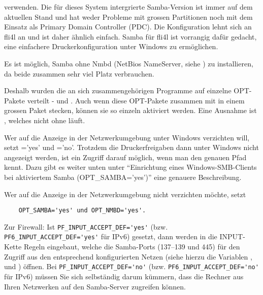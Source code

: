 
    verwenden. Die für dieses System intergrierte Samba-Version ist immer auf
    dem aktuellen Stand und hat weder Probleme mit grossen Partitionen noch mit
    dem Einsatz als Primary Domain Controller (PDC). Die Konfiguration lehnt
    sich an fli4l an und ist daher ähnlich einfach.
    Samba für fli4l ist vorrangig dafür gedacht, eine einfachere
    Druckerkonfiguration unter Windows zu ermöglichen.

    Es ist möglich, Samba ohne Nmbd (NetBios NameServer, siehe )
    zu installieren, da beide zusammen sehr viel Platz verbrauchen.

    Deshalb wurden die an sich zusammengehörigen Programme auf einzelne OPT-
    Pakete verteilt -  und .
    Auch wenn diese OPT-Pakete zusammen mit  in einem
    grossen Paket stecken, können sie so einzeln aktiviert werden.
    Eine Ausnahme ist , welches nicht ohne  läuft.

    Wer auf die Anzeige in der Netzwerkumgebung unter Windows verzichten will,
    setzt ='yes' und ='no'.
    Trotzdem die Druckerfreigaben dann unter Windows nicht angezeigt werden, ist ein
    Zugriff darauf möglich, wenn man den genauen Pfad kennt. Dazu gibt es weiter
    unten unter ``Einrichtung eines Windows-SMB-Clients bei aktiviertem Samba
    (OPT\_SAMBA='yes')'' eine genauere Beschreibung.

    Wer auf die Anzeige in der Netzwerkumgebung nicht verzichten möchte, setzt
\begin{example}
\begin{verbatim}
    OPT_SAMBA='yes' und OPT_NMBD='yes'.
\end{verbatim}
\end{example}

    Zur Firewall: Ist \verb+PF_INPUT_ACCEPT_DEF='yes'+ (bzw.
    \verb+PF6_INPUT_ACCEPT_DEF='yes'+ für IPv6) gesetzt, dann werden in die
    INPUT-Kette Regeln eingebaut, welche die Samba-Ports (137--139 und 445)
    für den Zugriff aus den entsprechend konfigurierten Netzen (siehe hierzu die
    Variablen ,
     und
    ) öffnen. Bei
    \verb+PF_INPUT_ACCEPT_DEF='no'+ (bzw. \verb+PF6_INPUT_ACCEPT_DEF='no'+ für
    IPv6) müssen Sie sich selbständig darum kümmern, dass die Rechner aus Ihren
    Netzwerken auf den Samba-Server zugreifen können.

